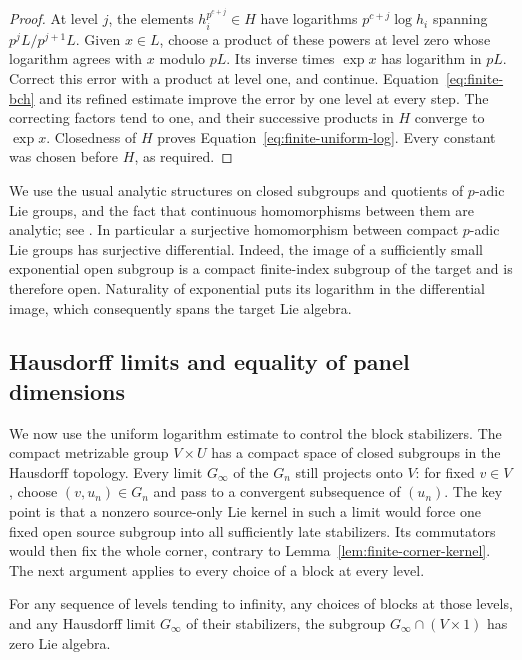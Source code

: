 \begin{proof}
At level $j$, the elements $h_i^{p^{c+j}}\in H$ have logarithms
$p^{c+j}\log h_i$ spanning $p^jL/p^{j+1}L$.
Given $x\in L$, choose a product of these powers at level zero
whose logarithm agrees with $x$ modulo $pL$.  Its inverse times
$\exp x$ has logarithm in $pL$.
Correct this error with a product at level one, and continue.
Equation~\eqref{eq:finite-bch} and its refined estimate improve the
error by one level at every step.  The correcting factors tend to
one, and their successive products in $H$ converge to $\exp x$.
Closedness of $H$ proves Equation~\eqref{eq:finite-uniform-log}.
Every constant was chosen before $H$, as required.
\end{proof}

We use the usual analytic structures on closed subgroups and
quotients of $p$-adic Lie groups, and the fact that continuous
homomorphisms between them are analytic; see
\cite[Propositions~2.2--2.3]{Gloeckner2008}.
In particular a surjective homomorphism between compact $p$-adic
Lie groups has surjective differential.  Indeed, the image of a
sufficiently small exponential open subgroup is a compact
finite-index subgroup of the target and is therefore open.
Naturality of exponential puts its logarithm in the differential
image, which consequently spans the target Lie algebra.

\subsection{Hausdorff limits and equality of panel dimensions}

We now use the uniform logarithm estimate to control the block
stabilizers.  The compact metrizable group $V\times U$ has a compact
space of closed subgroups in the Hausdorff topology.  Every limit
$G_\infty$ of the $G_n$ still projects onto $V$: for fixed $v\in V$,
choose $(v,u_n)\in G_n$ and pass to a convergent subsequence of $(u_n)$.
The key point is that a nonzero source-only Lie kernel in such a limit
would force one fixed open source subgroup into all sufficiently late
stabilizers.  Its commutators would then fix the whole corner, contrary
to Lemma~\ref{lem:finite-corner-kernel}.  The next argument applies to
every choice of a block at every level.

\begin{lemma}
\label{lem:finite-limit-kernel}
For any sequence of levels tending to infinity, any choices of
blocks at those levels, and any Hausdorff limit $G_\infty$ of their
stabilizers, the subgroup $G_\infty\cap(V\times1)$ has zero Lie
algebra.
\end{lemma}

